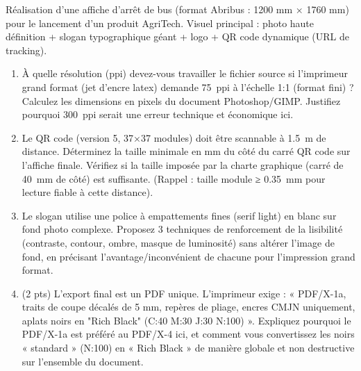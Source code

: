 \documentclass[11pt]{article}
\begin{document}
\begin{exercice}
Réalisation d'une affiche d'arrêt de bus (format Abribus : 1200 mm × 1760 mm) pour le lancement d'un produit AgriTech. Visuel principal : photo haute définition + slogan typographique géant + logo + QR code dynamique (URL de tracking).

\begin{enumerate}
    \item À quelle résolution (ppi) devez-vous travailler le fichier source si l'imprimeur grand format (jet d'encre latex) demande \SI{75}{ppi} à l'échelle 1:1 (format fini) ? Calculez les dimensions en pixels du document Photoshop/GIMP. Justifiez pourquoi \SI{300}{ppi} serait une erreur technique et économique ici.
    \item Le QR code (version 5, 37×37 modules) doit être scannable à \SI{1,5}{m} de distance. Déterminez la taille minimale en mm du côté du carré QR code sur l'affiche finale. Vérifiez si la taille imposée par la charte graphique (carré de \SI{40}{mm} de côté) est suffisante. (Rappel : taille module ≥ \SI{0,35}{mm} pour lecture fiable à cette distance).
    \item Le slogan utilise une police à empattements fines (serif light) en blanc sur fond photo complexe. Proposez 3 techniques de renforcement de la lisibilité (contraste, contour, ombre, masque de luminosité) sans altérer l'image de fond, en précisant l'avantage/inconvénient de chacune pour l'impression grand format.
    \item (2 pts) L'export final est un PDF unique. L'imprimeur exige : « PDF/X-1a, traits de coupe décalés de 5 mm, repères de pliage, encres CMJN uniquement, aplats noirs en "Rich Black" (C:40 M:30 J:30 N:100) ». Expliquez pourquoi le PDF/X-1a est préféré au PDF/X-4 ici, et comment vous convertissez les noirs « standard » (N:100) en « Rich Black » de manière globale et non destructive sur l'ensemble du document.
\end{enumerate}
\end{exercice}
\end{document}
